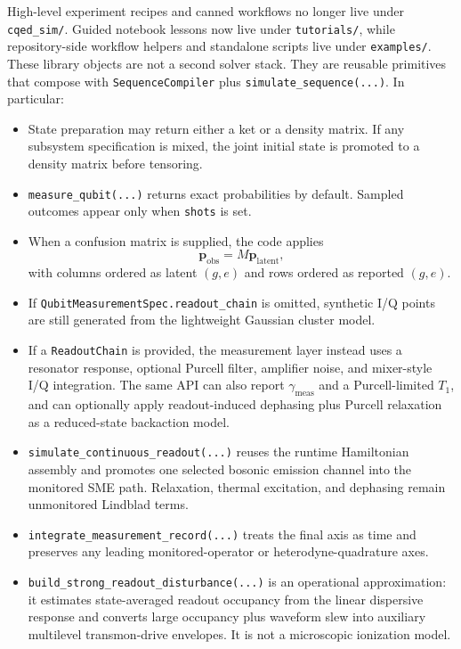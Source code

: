 \documentclass[11pt]{article}
\begin{document}
\noindent
High-level experiment recipes and canned workflows no longer live under
\texttt{cqed\_sim/}. Guided notebook lessons now live under \texttt{tutorials/},
while repository-side workflow helpers and standalone scripts live under
\texttt{examples/}. These library objects are not a second solver stack. They are
reusable primitives that compose with \texttt{SequenceCompiler} plus
\texttt{simulate\_sequence(...)}.
In particular:
\begin{itemize}[leftmargin=1.5em]
  \item State preparation may return either a ket or a density matrix. If any
  subsystem specification is mixed, the joint initial state is promoted to a
  density matrix before tensoring.
  \item \texttt{measure\_qubit(...)} returns exact probabilities by default.
  Sampled outcomes appear only when \texttt{shots} is set.
  \item When a confusion matrix is supplied, the code applies
  \[
  \mathbf{p}_{\mathrm{obs}} = M \mathbf{p}_{\mathrm{latent}},
  \]
  with columns ordered as latent \((g,e)\) and rows ordered as reported \((g,e)\).
  \item If \texttt{QubitMeasurementSpec.readout\_chain} is omitted, synthetic I/Q
  points are still generated from the lightweight Gaussian cluster model.
  \item If a \texttt{ReadoutChain} is provided, the measurement layer instead uses
  a resonator response, optional Purcell filter, amplifier noise, and mixer-style
  I/Q integration. The same API can also report \(\gamma_{\mathrm{meas}}\) and a
  Purcell-limited \(T_1\), and can optionally apply readout-induced dephasing plus
  Purcell relaxation as a reduced-state backaction model.
  \item \texttt{simulate\_continuous\_readout(...)} reuses the runtime Hamiltonian
  assembly and promotes one selected bosonic emission channel into the monitored SME
  path. Relaxation, thermal excitation, and dephasing remain unmonitored Lindblad
  terms.
  \item \texttt{integrate\_measurement\_record(...)} treats the final axis as time
  and preserves any leading monitored-operator or heterodyne-quadrature axes.
  \item \texttt{build\_strong\_readout\_disturbance(...)} is an operational
  approximation: it estimates state-averaged readout occupancy from the linear
  dispersive response and converts large occupancy plus waveform slew into auxiliary
  multilevel transmon-drive envelopes. It is not a microscopic ionization model.
\end{itemize}
\end{document}
